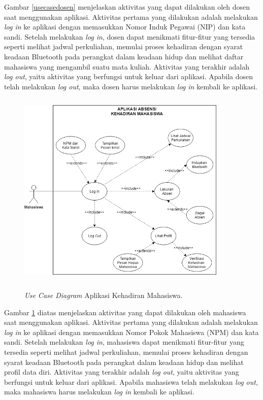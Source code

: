 \par Gambar \ref{usecasedosen} menjelaskan aktivitas yang dapat dilakukan oleh dosen saat menggunakan aplikasi. Aktivitas pertama yang dilakukan adalah melakukan \textit{log in} ke aplikasi dengan memasukkan Nomor Induk Pegawai (NIP) dan kata sandi. Setelah melakukan \textit{log in}, dosen dapat menikmati fitur-fitur yang tersedia seperti melihat jadwal perkuliahan, memulai proses kehadiran dengan syarat keadaan Bluetooth pada perangkat dalam keadaan hidup dan melihat daftar mahasiswa yang mengambil suatu mata kuliah. Aktivitas yang terakhir adalah \textit{log out}, yaitu aktivitas yang berfungsi untuk keluar dari aplikasi. Apabila dosen telah melakukan \textit{log out}, maka dosen harus melakukan \textit{log in} kembali ke aplikasi.
	
	\begin{figure}[H] 
		\center
		\shadowbox
		{\includegraphics [width=10cm, height=9.5cm]{gambar/model/use-case-mahasiswa}}
		\caption{\textit{Use Case Diagram} Aplikasi Kehadiran Mahasiswa.}
		\label{usecasemahasiswa}
	\end{figure}
	
\par Gambar \ref{usecasemahasiswa} diatas menjelaskan aktivitas yang dapat dilakukan oleh mahasiswa saat menggunakan aplikasi. Aktivitas pertama yang dilakukan adalah melakukan \textit{log in} ke aplikasi dengan memasukkan Nomor Pokok Mahasiswa (NPM) dan kata sandi. Setelah melakukan \textit{log in}, mahasiswa dapat menikmati fitur-fitur yang tersedia seperti melihat jadwal perkuliahan, memulai proses kehadiran dengan syarat keadaan Bluetooth pada perangkat dalam keadaan hidup dan melihat profil data diri. Aktivitas yang terakhir adalah \textit{log out}, yaitu aktivitas yang berfungsi untuk keluar dari aplikasi. Apabila mahasiswa telah melakukan \textit{log out}, maka mahasiswa harus melakukan \textit{log in} kembali ke aplikasi.

